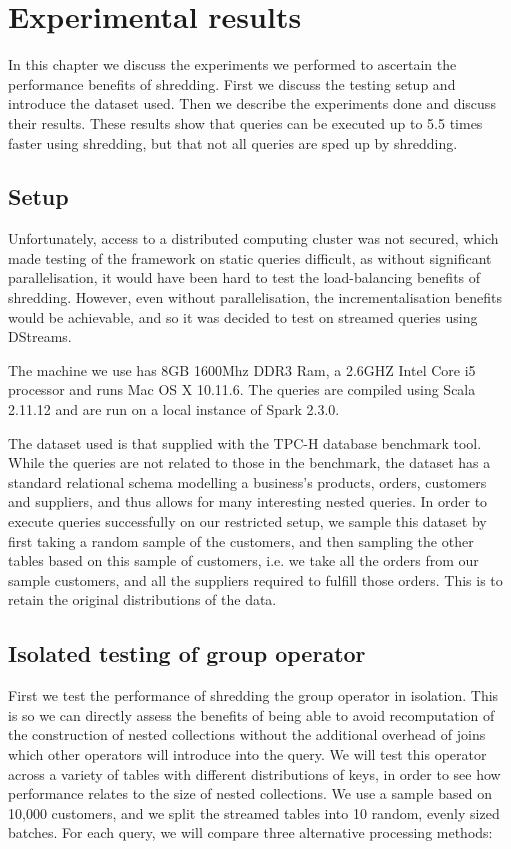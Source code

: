 \chapter{Experimental results} \label{results}

In this chapter we discuss the experiments we performed to ascertain the performance benefits of shredding. First we discuss the testing setup and introduce the dataset used. Then we describe the experiments done and discuss their results. These results show that queries can be executed up to 5.5 times faster using shredding, but that not all queries are sped up by shredding.

\section{Setup}

Unfortunately, access to a distributed computing cluster was not secured, which made testing of the framework on static queries difficult, as without significant parallelisation, it would have been hard to test the load-balancing benefits of shredding. However, even without parallelisation, the incrementalisation benefits would be achievable, and so it was decided to test on streamed queries using DStreams.

The machine we use has 8GB 1600Mhz DDR3 Ram, a 2.6GHZ Intel Core i5 processor and runs Mac OS X 10.11.6. The queries are compiled using Scala 2.11.12 and are run on a local instance of Spark 2.3.0. 

The dataset used is that supplied with the TPC-H \cite{tpch} database benchmark tool. While the queries are not related to those in the benchmark, the dataset has a standard relational schema modelling a business's products, orders, customers and suppliers, and thus allows for many interesting nested queries. In order to execute queries successfully on our restricted setup, we sample this dataset by first taking a random sample of the customers, and then sampling the other tables based on this sample of customers, i.e. we take all the orders from our sample customers, and all the suppliers required to fulfill those orders. This is to retain the original distributions of the data.

\section{Isolated testing of group operator}
First we test the performance of shredding the group operator in isolation. This is so we can directly assess the benefits of being able to avoid recomputation of the construction of nested collections without the additional overhead of joins which other operators will introduce into the query. We will test this operator across a variety of tables with different distributions of keys, in order to see how performance relates to the size of nested collections. We use a sample based on 10,000 customers, and we split the streamed tables into 10 random, evenly sized batches. For each query, we will compare three alternative processing methods:

